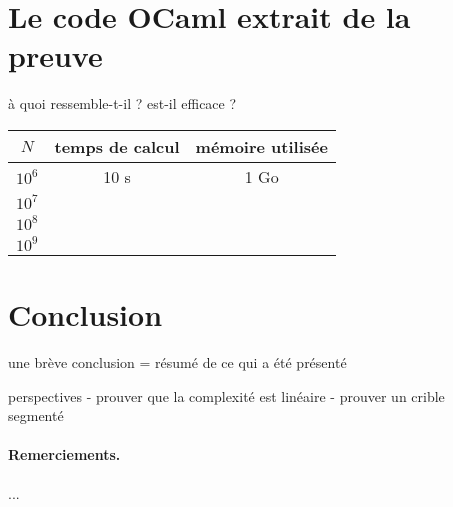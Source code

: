 \documentclass[a4paper]{easychair}
\begin{document}
\section{Le code OCaml extrait de la preuve}

à quoi ressemble-t-il ?
est-il efficace ?

\begin{center}
  \begin{tabular}{|c|c|c|}
    \hline
    $N$ & temps de calcul & mémoire utilisée \\
    \hline\hline
    $10^6$ & 10 s & 1 Go \\\hline
    $10^7$ & \\\hline
    $10^8$ & \\\hline
    $10^9$ & \\\hline
  \end{tabular}
\end{center}

\section{Conclusion}
\label{sec:conclusion}

une brève conclusion = résumé de ce qui a été présenté

perspectives
- prouver que la complexité est linéaire
- prouver un crible segmenté~\cite{crible-segmente}


\paragraph{Remerciements.} ...



\end{document}
